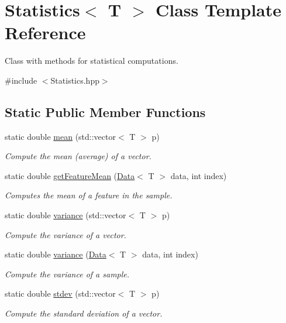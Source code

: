 \hypertarget{class_statistics}{}\section{Statistics$<$ T $>$ Class Template Reference}
\label{class_statistics}


Class with methods for statistical computations.  




{\ttfamily \#include $<$Statistics.\+hpp$>$}

\subsection*{Static Public Member Functions}
\begin{DoxyCompactItemize}
\item 
static double \hyperlink{class_statistics_a5c3639c37f312703cdebfe179a3c5180}{mean} (std\+::vector$<$ T $>$ p)
\begin{DoxyCompactList}\small\item\em Compute the mean (average) of a vector. \end{DoxyCompactList}\item 
static double \hyperlink{class_statistics_a0e62b9652ef3e3827daaed01c48faaa0}{get\+Feature\+Mean} (\hyperlink{class_data}{Data}$<$ T $>$ data, int index)
\begin{DoxyCompactList}\small\item\em Computes the mean of a feature in the sample. \end{DoxyCompactList}\item 
static double \hyperlink{class_statistics_a4c323761a6c8704bf25d68d7818fe7c5}{variance} (std\+::vector$<$ T $>$ p)
\begin{DoxyCompactList}\small\item\em Compute the variance of a vector. \end{DoxyCompactList}\item 
static double \hyperlink{class_statistics_a02f605eec578754e63de82acce5a3f34}{variance} (\hyperlink{class_data}{Data}$<$ T $>$ data, int index)
\begin{DoxyCompactList}\small\item\em Compute the variance of a sample. \end{DoxyCompactList}\item 
static double \hyperlink{class_statistics_accf969226645d2fe2cb16ab24c3eeb33}{stdev} (std\+::vector$<$ T $>$ p)
\begin{DoxyCompactList}\small\item\em Compute the standard deviation of a vector. \end{DoxyCompactList}\item 

\end{DoxyCompactItemize}
